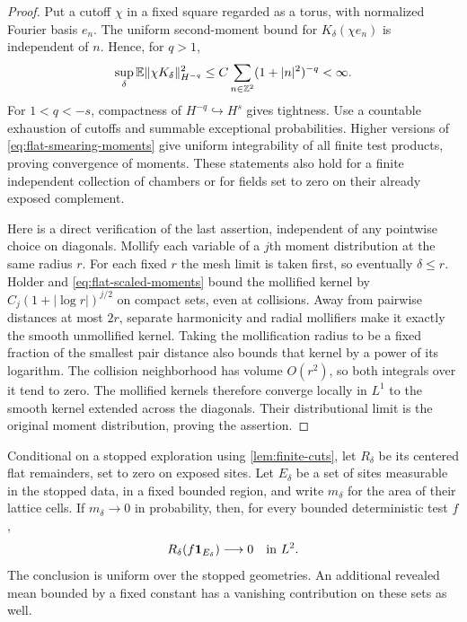 \begin{proof}
Put a cutoff $\chi$ in a fixed square regarded as a torus, with normalized
Fourier basis $e_n$. The uniform second-moment bound for
$K_\delta(\chi e_n)$ is independent of $n$. Hence, for $q>1$,
\[
 \sup_\delta\mathbb E\|\chi K_\delta\|_{H^{-q}}^2
 \le C\sum_{n\in\mathbb Z^2}(1+|n|^2)^{-q}<\infty.
\]
For $1<q<-s$, compactness of $H^{-q}\hookrightarrow H^s$ gives tightness.
Use a countable exhaustion of cutoffs and summable exceptional probabilities.
Higher versions of \cref{eq:flat-smearing-moments} give uniform
integrability of all finite test products, proving convergence of moments.
These statements also hold for a finite independent collection of chambers or
for fields set to zero on their already exposed complement.

Here is a direct verification of the last assertion, independent of any
pointwise choice on diagonals. Mollify each variable of a $j$th moment
distribution at the same radius $r$. For each fixed $r$ the mesh limit is
taken first, so eventually $\delta\le r$. Holder and
\cref{eq:flat-scaled-moments} bound the mollified kernel by
$C_j(1+|\log r|)^{j/2}$ on compact sets, even at collisions. Away from
pairwise distances at most $2r$, separate harmonicity and radial mollifiers
make it exactly the smooth unmollified kernel. Taking the mollification
radius to be a fixed fraction of the smallest pair distance also bounds
that kernel by a power of its logarithm. The collision neighborhood has
volume $O(r^2)$, so both integrals over it tend to zero. The mollified kernels
therefore converge locally in $L^1$ to the smooth kernel extended across
the diagonals. Their distributional limit is the original moment
distribution, proving the assertion.
\end{proof}

\begin{lemma}
\label{lem:small-set-remainders}
Conditional on a stopped exploration using \cref{lem:finite-cuts}, let
$R_\delta$ be its centered flat remainders, set to zero on exposed sites.
Let $E_\delta$ be a set of sites measurable in the stopped data, in a fixed
bounded region,
and write $m_\delta$ for the area of their lattice cells. If
$m_\delta\to0$ in probability, then, for every bounded deterministic test $f$,
\[
           R_\delta(f\mathbf 1_{E_\delta})\longrightarrow0
                           \quad\text{in }L^2.
\]
The conclusion is uniform over the stopped geometries. An additional
revealed mean bounded by a fixed constant has a vanishing contribution on
these sets as well.
\end{lemma}

